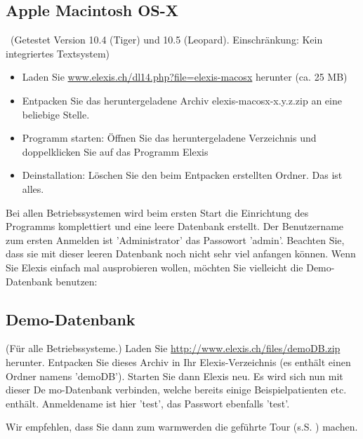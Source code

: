 \subsection{Apple Macintosh OS-X}\
(Getestet Version 10.4 (Tiger) und 10.5 (Leopard). Einschränkung: Kein integriertes Textsystem)
\index{Macintosh}\index{Apple}
\begin{itemize}
	\item Laden Sie \href{http://www.elexis.ch/dl14.php?file=elexis-macosx}{www.elexis.ch/dl14.php?file=elexis-macosx} herunter (ca. 25 MB)
	\item Entpacken Sie das heruntergeladene Archiv elexis-macosx-x.y.z.zip an eine beliebige Stelle.
    \item Programm starten: Öffnen Sie das herunter\-geladene Verzeichnis und doppel\-klic\-ken Sie auf das Pro\-gramm \glqq Elexis\grqq{}
	\item Deinstallation: Löschen Sie den beim Entpacken erstellten Ordner. Das ist alles.
\end{itemize}

Bei allen Betriebssystemen wird beim ersten Start die Einrichtung des Programms komplettiert und eine leere Datenbank erstellt. Der Benutzername zum ersten Anmelden ist 'Administrator' das Passowort 'admin'. Beachten Sie, dass sie mit dieser leeren Datenbank noch nicht sehr viel anfangen können. Wenn Sie Elexis einfach mal ausprobieren wollen, möchten Sie vielleicht die Demo-Datenbank benutzen:

\subsection{Demo-Datenbank}
(Für alle Betriebssysteme.) Laden Sie \href{http://www.elexis.ch/files/demoDB.zip}{http://www.elexis.ch/files/demoDB.zip} herunter. Entpacken Sie dieses Archiv in Ihr Elexis-Verzeichnis (es enthält einen Ordner namens 'demoDB'). Starten Sie dann Elexis neu. Es wird sich nun mit dieser De
mo-Datenbank verbinden, welche bereits einige Beispielpatienten etc. enthält. Anmeldename ist hier 'test', das Passwort ebenfalls 'test'.

Wir empfehlen, dass Sie dann zum \glqq warmwerden\grqq{} die geführte Tour (s.S.
\pageref{tour}) machen.

